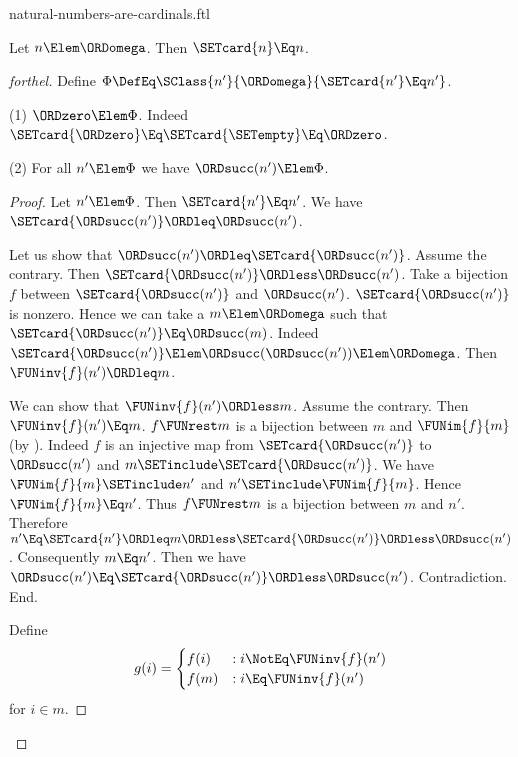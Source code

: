 \documentclass{stex}
\begin{document}
\begin{smodule}{natural-numbers-are-cardinals.ftl}

\begin{theorem}[forthel]
  Let $n \Elem \ORDomega$.
  Then $\SETcard{n} \Eq n$.
\end{theorem}
\begin{proof}[forthel]
  Define $\Phi \DefEq \SClass{n'}{\ORDomega}{\SETcard{n'} \Eq n'}$.

  (1) $\ORDzero \Elem \Phi$.
  Indeed $\SETcard{\ORDzero} \Eq \SETcard{\SETempty} \Eq \ORDzero$.

  (2) For all $n' \Elem \Phi$ we have $\ORDsucc(n') \Elem \Phi$.
  \begin{proof}
    Let $n' \Elem \Phi$.
    Then $\SETcard{n'} \Eq n'$.
    We have $\SETcard{\ORDsucc(n')} \ORDleq \ORDsucc(n')$.

    Let us show that $\ORDsucc(n') \ORDleq \SETcard{\ORDsucc(n')}$.
      Assume the contrary.
      Then $\SETcard{\ORDsucc(n')} \ORDless \ORDsucc(n')$.
      Take a bijection $f$ between $\SETcard{\ORDsucc(n')}$ and $\ORDsucc(n')$.
      $\SETcard{\ORDsucc(n')}$ is nonzero.
      Hence we can take a $m \Elem \ORDomega$ such that $\SETcard{\ORDsucc(n')} \Eq \ORDsucc(m)$.
      Indeed $\SETcard{\ORDsucc(n')} \Elem \ORDsucc(\ORDsucc(n')) \Elem \ORDomega$.
      Then $\FUNinv{f}(n') \ORDleq m$.

      We can show that $\FUNinv{f}(n') \ORDless m$.
        Assume the contrary.
        Then $\FUNinv{f}(n') \Eq m$.
        $f \FUNrest m$ is a bijection between $m$ and $\FUNim{f}{m}$ (by ).
        Indeed $f$ is an injective map from $\SETcard{\ORDsucc(n')}$ to $\ORDsucc(n')$ and
        $m \SETinclude \SETcard{\ORDsucc(n')}$.
        We have $\FUNim{f}{m} \SETinclude n'$ and $n' \SETinclude \FUNim{f}{m}$.
        Hence $\FUNim{f}{m} \Eq n'$.
        Thus $f \FUNrest m$ is a bijection between $m$ and $n'$.
        Therefore $n'
          \Eq \SETcard{n'}
          \ORDleq m
          \ORDless \SETcard{\ORDsucc(n')}
          \ORDless \ORDsucc(n')$.
        Consequently $m \Eq n'$.
        Then we have $\ORDsucc(n') \Eq \SETcard{\ORDsucc(n')} \ORDless \ORDsucc(n')$.
        Contradiction.
      End.

      Define \[ g(i) =
        \begin{cases}
          f(i)  & : i \NotEq \FUNinv{f}(n')
          \\
          f(m)  & : i \Eq \FUNinv{f}(n')
        \end{cases} \]
      for $i \in m$.


\end{proof}
\end{proof}
\end{smodule}
\end{document}
